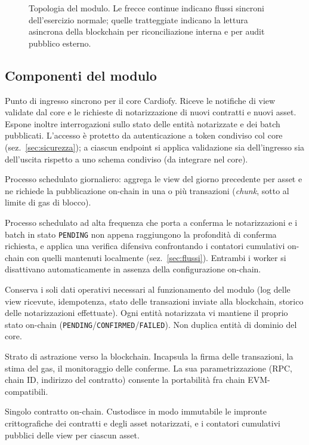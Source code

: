 \documentclass[a4paper,11pt]{article}
\begin{document}
\begin{figure}[h!]
\begin{tikzpicture}[node distance=0.8cm and 1.4cm]
\end{tikzpicture}
\caption{Topologia del modulo. Le frecce continue indicano flussi sincroni dell'esercizio normale; quelle tratteggiate indicano la lettura asincrona della blockchain per riconciliazione interna e per audit pubblico esterno.}
\label{fig:topologia}
\end{figure}

\subsection{Componenti del modulo}

\begin{description}[leftmargin=0.5cm, itemsep=0.2em]
\item[REST API:] Punto di ingresso sincrono per il core Cardiofy. Riceve le notifiche di view validate dal core e le richieste di notarizzazione di nuovi contratti e nuovi asset. Espone inoltre interrogazioni sullo stato delle entit\`a notarizzate e dei batch pubblicati. L'accesso \`e protetto da autenticazione a token condiviso col core (sez.~\ref{sec:sicurezza}); a ciascun endpoint si applica validazione sia dell'ingresso sia dell'uscita rispetto a uno schema condiviso (da integrare nel core).

\item[Batch Worker:] Processo schedulato giornaliero: aggrega le view del giorno precedente per asset e ne richiede la pubblicazione on-chain in una o pi\`u transazioni (\emph{chunk}, sotto al limite di gas di blocco).

\item[Reconciliation Worker:] Processo schedulato ad alta frequenza che porta a conferma le notarizzazioni e i batch in stato \texttt{PENDING} non appena raggiungono la profondit\`a di conferma richiesta, e applica una verifica difensiva confrontando i contatori cumulativi on-chain con quelli mantenuti localmente (sez.~\ref{sec:flussi}). Entrambi i worker si disattivano automaticamente in assenza della configurazione on-chain.

\item[Base dati operativa:] Conserva i soli dati operativi necessari al funzionamento del modulo (log delle view ricevute, idempotenza, stato delle transazioni inviate alla blockchain, storico delle notarizzazioni effettuate). Ogni entit\`a notarizzata vi mantiene il proprio stato on-chain (\texttt{PENDING}/\texttt{CONFIRMED}/\texttt{FAILED}). Non duplica entit\`a di dominio del core.

\item[Chain Adapter.] Strato di astrazione verso la blockchain. Incapsula la firma delle transazioni, la stima del gas, il monitoraggio delle conferme. La sua parametrizzazione (RPC, chain ID, indirizzo del contratto) consente la portabilit\`a fra chain EVM-compatibili.

\item[Smart Contract \texttt{Notary}.] Singolo contratto on-chain. Custodisce in modo immutabile le impronte crittografiche dei contratti e degli asset notarizzati, e i contatori cumulativi pubblici delle view per ciascun asset.
\end{description}
\end{document}
